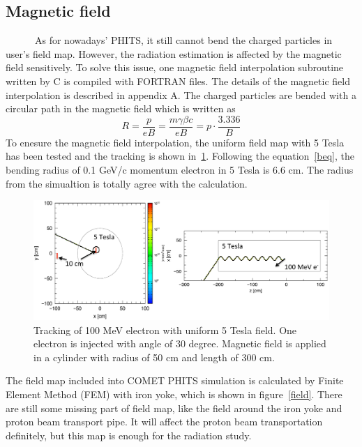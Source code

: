  \subsection{Magnetic field}
~~~~~~As for nowadays' PHITS, it still cannot bend the charged particles in user's field map.
However, the radiation estimation is affected by the magnetic field sensitively.
To solve this issue, one magnetic field interpolation subroutine written by C is compiled with FORTRAN files.
The details of the magnetic field interpolation is described in appendix A.
The charged particles are bended with a circular path in the magnetic field which is written as
\begin{equation}
 R = \frac{p}{eB} = \frac{m\gamma \beta c}{eB} = p \cdot \frac{3.336}{B}
\label{beq}
\end{equation}
To enesure the magnetic field interpolation, the uniform field map with 5 Tesla has been tested and the tracking is shown in~\ref{2uniform}.
Following the equation~\ref{beq}, the bending radius of 0.1 GeV/c momentum electron in 5 Tesla is 6.6 cm.
The radius from the simualtion is totally agree with the calculation.
 \begin{figure}[H]
  \centering
  \includegraphics[scale=0.45]{chapter3/fig/magtest.pdf}
  \caption{Tracking of 100 MeV electron with uniform 5 Tesla field. One electron is injected with angle of 30 degree. Magnetic field is applied in a cylinder with radius of 50 cm and length of 300 cm.}
  \label{2uniform}
 \end{figure}
The field map included into COMET PHITS simulation is calculated by Finite Element Method (FEM) with iron yoke, which is shown in figure~\ref{field}.
There are still some missing part of field map, like the field around the iron yoke and proton beam transport pipe.
It will affect the proton beam transportation definitely, but this map is enough for the radiation study.

